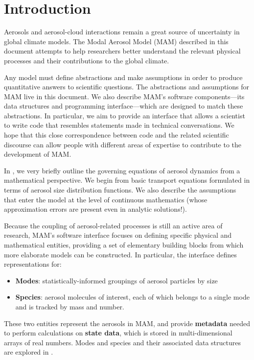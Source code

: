 \section{Introduction}

Aerosols and aerosol-cloud interactions remain a great source of uncertainty
in global climate models. The Modal Aerosol Model (MAM) described in this
document attempts to help researchers better understand the relevant physical
processes and their contributions to the global climate.

Any model must define abstractions and make assumptions in order to produce
quantitative answers to scientific questions. The abstractions and assumptions
for MAM live in this document. We also describe MAM's software
components---its data structures and programming interface---which are designed
to match these abstractions. In particular, we aim to provide an interface that
allows a scientist to write code that resembles statements made in technical
conversations. We hope that this close correspondence between code and
the related scientific discourse can allow people with different areas of
expertise to contribute to the development of MAM.

In , we very briefly outline the governing equations of
aerosol dynamics from a mathematical perspective. We begin from basic transport
equations formulated in terms of aerosol size distribution functions. We also
describe the assumptions that enter the model at the level of continuous
mathematics (whose approximation errors are present even in analytic
solutions!).

Because the coupling of aerosol-related processes is still an active area of
research, MAM's software interface focuses on defining specific physical and
mathematical entities, providing a set of elementary building blocks from which
more elaborate models can be constructed. In particular, the interface defines
representations for:

\begin{itemize}
  \item {\bf Modes}: statistically-informed groupings of aerosol particles by
        size
  \item {\bf Species}: aerosol molecules of interest, each of which belongs to a
        single mode and is tracked by mass and number.
\end{itemize}

These two entities represent the aerosols in MAM, and provide {\bf metadata} needed to
perform calculations on {\bf state data}, which is stored in multi-dimensional
arrays of real numbers. Modes and species and their associated data structures
are explored in .

